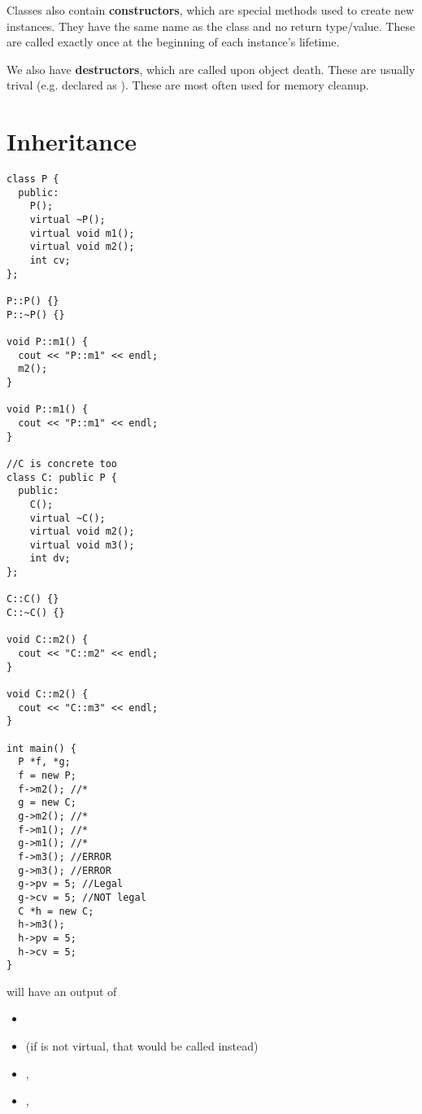 \documentclass[12pt]{article}
\begin{document}
Classes also contain {\bf constructors}, which are special methods used to create new instances. They have the same name as the class and no return type/value. These are called exactly once at the beginning of each instance's lifetime.

We also have {\bf destructors}, which are called upon object death. These are usually trival (e.g. declared as ). These are most often used for memory cleanup.

\section*{Inheritance}
\begin{verbatim}
class P {
  public:
    P();
    virtual ~P();
    virtual void m1();
    virtual void m2();
    int cv;
};

P::P() {}
P::~P() {}

void P::m1() {
  cout << "P::m1" << endl;
  m2();
}

void P::m1() {
  cout << "P::m1" << endl;
}

//C is concrete too
class C: public P {
  public:
    C();
    virtual ~C();
    virtual void m2();
    virtual void m3();
    int dv;
};

C::C() {}
C::~C() {}

void C::m2() {
  cout << "C::m2" << endl;
}

void C::m2() {
  cout << "C::m3" << endl;
}

int main() {
  P *f, *g;
  f = new P;
  f->m2(); //*
  g = new C;
  g->m2(); //*
  f->m1(); //*
  g->m1(); //*
  f->m3(); //ERROR
  g->m3(); //ERROR
  g->pv = 5; //Legal
  g->cv = 5; //NOT legal
  C *h = new C;
  h->m3();
  h->pv = 5;
  h->cv = 5;
}
\end{verbatim}
will have an output of
\begin{itemize}
\item {}
\item {} (if  is not virtual, that would be called instead)
\item {}, 
\item {}, 
\end{itemize}
\end{document}
